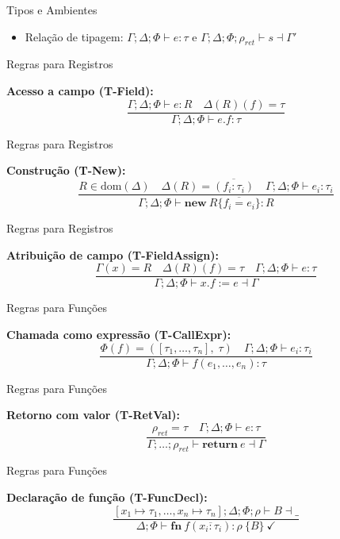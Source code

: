 \begin{frame}{Tipos e Ambientes}

    \begin{itemize}

        \item
        Relação de tipagem: \(\Gamma;\Delta;\Phi \vdash e : \tau\) e
        \(\Gamma;\Delta;\Phi;\rho_\mathit{ret} \vdash s \dashv \Gamma'\)
    \end{itemize}
\end{frame}

\begin{frame}{Regras para Registros}

    \textbf{Acesso a campo (T-Field):}
    \[\frac{\Gamma;\Delta;\Phi \vdash e : R \quad \Delta(R)(f) = \tau}{\Gamma;\Delta;\Phi \vdash e.f : \tau}\]
\end{frame}

\begin{frame}{Regras para Registros}

    \textbf{Construção (T-New):}
    \[\frac{R \in \mathrm{dom}(\Delta) \quad \Delta(R) = \overline{(f_i:\tau_i)} \quad \Gamma;\Delta;\Phi \vdash e_i : \tau_i}{\Gamma;\Delta;\Phi \vdash \mathbf{new}\ R\{\overline{f_i=e_i}\} : R}\]
\end{frame}

\begin{frame}{Regras para Registros}

    \textbf{Atribuição de campo (T-FieldAssign):}
    \[\frac{\Gamma(x) = R \quad \Delta(R)(f) = \tau \quad \Gamma;\Delta;\Phi \vdash e : \tau}{\Gamma;\Delta;\Phi \vdash x.f := e \dashv \Gamma}\]
\end{frame}

\begin{frame}{Regras para Funções}

    \textbf{Chamada como expressão (T-CallExpr):}
    \[\frac{\Phi(f) = ([\tau_1,\ldots,\tau_n],\;\tau) \quad \Gamma;\Delta;\Phi \vdash e_i : \tau_i}{\Gamma;\Delta;\Phi \vdash f(e_1,\ldots,e_n) : \tau}\]
\end{frame}

\begin{frame}{Regras para Funções}

    \textbf{Retorno com valor (T-RetVal):}
    \[\frac{\rho_\mathit{ret} = \tau \quad \Gamma;\Delta;\Phi \vdash e : \tau}{\Gamma;\ldots;\rho_\mathit{ret} \vdash \mathbf{return}\ e \dashv \Gamma}\]
\end{frame}

\begin{frame}{Regras para Funções}

    \textbf{Declaração de função (T-FuncDecl):}
    \[\frac{[x_1\!\mapsto\!\tau_1,\ldots,x_n\!\mapsto\!\tau_n];\Delta;\Phi;\rho \vdash B \dashv \_}{\Delta;\Phi \vdash \mathbf{fn}\ f(\overline{x_i:\tau_i}):\rho\ \{B\}\ \checkmark}\]
\end{frame}


